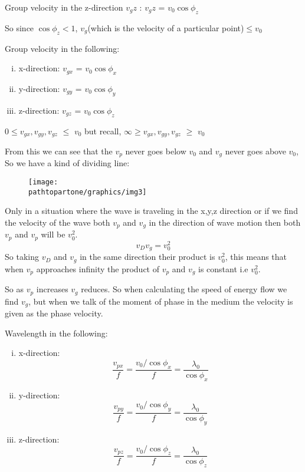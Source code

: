 \begin{center}
Group velocity in the z-direction $v_gz$ :
$v_gz$ = $v_0\cos\phi_{z}$
\end{center}
So since $\cos\phi_{z} < 1$, $v_g$(which is the velocity of a particular point)$\leq v_0$


Group velocity in the following:
\begin{enumerate}[(i)]
\item x-direction:	$v_{gx}$ = $v_0\cos\phi_{x}$
\item y-direction: 	$v_{gy}$ = $v_0\cos\phi_{y}$
\item z-direction:	$v_{gz}$ = $v_0\cos\phi_{z}$
\end{enumerate}
$0\leq v_{gx},v_{gy},v_{gz}$ $\leq$ $v_0$ but recall, $\infty\geq v_{gx},v_{gy},v_{gz}$ $\geq$ $v_0$

From this we can see that the $v_p$ never goes below $v_0$ and $v_g$ never goes above $v_0$,
So we have a kind of dividing line:
\begin{figure}[h]
\centering
\texttt{[image: \\pathtopartone/graphics/img3]}
\caption{}
\end{figure}

Only in a situation where the wave is traveling in the x,y,z direction or if we find the velocity of the wave both $v_p$ and $v_g$ in the direction of wave motion then both $v_p$ and $v_p$ will be $v_{0}^2$.
\begin{equation}
v_D v_g = v_{0}^2
\end{equation}
So taking $v_D$ and $v_g$ in the same direction their product is $v_{0}^2$, this means that when $v_p$ approaches infinity the product of $v_p$ and $v_g$ is constant i.e $v_{0}^2$.

So as $v_p$ increases $v_g$ reduces. So when calculating the speed of energy flow we find $v_g$, but when we talk of the moment of phase in the medium the velocity is given as the phase velocity.

Wavelength in the following:
\begin{enumerate}[(i)]
\item x-direction: 
\begin{dmath*}	
\frac{v_{px}}{f} = \frac{v_0/\cos\phi_{x}}{f}
= \frac{\lambda_0}{\cos\phi_{x}}
\end{dmath*}
\item y-direction: 	
\begin{dmath*}
\frac{v_{py}}{f} = \frac{v_0/\cos\phi_{y}}{f}
= \frac{\lambda_0}{\cos\phi_{y}}
\end{dmath*}
\item z-direction: 	
\begin{dmath*}
\frac{v_{pz}}{f} = \frac{v_0/\cos\phi_{z}}{f}
= \frac{\lambda_0}{\cos\phi_{z}}
\end{dmath*}
\end{enumerate}